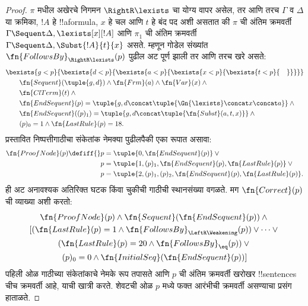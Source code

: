 \documentclass[../../../include/open-logic-section]{subfiles}
\begin{document}
\begin{proof}
$\pi$ मधील अखेरचे निगमन $\RightR\lexists$ चा योग्य वापर असेल,
तर आणि तरच $\Gamma$ व $\Delta$ या क्रमिका, $!A$ हे !!a{formula},
$x$ हे चल आणि $t$ हे बंद पद अशी असतात की $\pi$ ची अंतिम क्रमवर्ती
$\Gamma \Sequent \Delta, \lexists[x][!A]$ आणि $\pi_1$ ची अंतिम
क्रमवर्ती $\Gamma \Sequent \Delta, \Subst{!A}{t}{x}$ असते.
म्हणून गोडेल संख्यांत $\fn{FollowsBy}_{\RightR\lexists}(p)$ पुढील
अट पूर्ण झाली तर आणि तरच खरे असते:
\begin{align*}
  & \bexists{g<p}{\bexists{d<p}{\bexists{a<p}{\bexists{x<p}{\bexists{t<p}{\quad}}}}}\\
  & \qquad \fn{Sequent}(\tuple{g,d}) \land \fn{Frm}(a) \land \fn{Var}(x) \land {}\\
  & \qquad \fn{ClTerm}(t) \land {}\\
  & \qquad \fn{EndSequent}(p) =
  \tuple{
    g,
    d \concat \tuple{\Gn{\lexists} \concat x \concat a}
  } \land {}\\
  & \qquad \fn{EndSequent}((p)_1) =
  \tuple{
    g,
    d \concat \tuple{\fn{Subst}(a, t, x)}
  } \land {}\\
  & \qquad (p)_0 = 1 \land \fn{LastRule}(p) = 18.
\end{align*}
प्रस्तावित निष्पत्तीगाठीचा संकेतांक नेमक्या पुढीलपैकी एका रूपात असावा:
\begin{align*}
\fn{ProofNode}(p) \defiff {}& p=\tuple{0,\fn{EndSequent}(p)} \lor {}\\
& p=\tuple{1,(p)_1,\fn{EndSequent}(p),\fn{LastRule}(p)} \lor {}\\
& p=\tuple{2,(p)_1,(p)_2,\fn{EndSequent}(p),\fn{LastRule}(p)}.
\end{align*}
ही अट अनावश्यक अतिरिक्त घटक किंवा चुकीची गाठीची स्थानसंख्या वगळते.
मग $\fn{Correct}(p)$ ची व्याख्या अशी करतो:
\begin{multline*}
  \fn{ProofNode}(p) \land \fn{Sequent}(\fn{EndSequent}(p)) \land {}\\
  [(\fn{LastRule}(p) = 1 \land
  \fn{FollowsBy}_{\LeftR\Weakening}(p)) \lor \dots \lor {}\\
  (\fn{LastRule}(p) = 20 \land \fn{FollowsBy}_{\eq}(p)) \lor {}\\
  (p)_0 = 0 \land \fn{InitialSeq}(\fn{EndSequent}(p))]
\end{multline*}
पहिली ओळ गाठीच्या संकेतांकाचे नेमके रूप तपासते आणि $p$ ची अंतिम क्रमवर्ती खरोखर !!{sentence}s चीच
क्रमवर्ती आहे, याची खात्री करते. शेवटची ओळ $p$ मध्ये फक्त आरंभीची
क्रमवर्ती असण्याचा प्रसंग हाताळते.
\end{proof}
\end{document}
